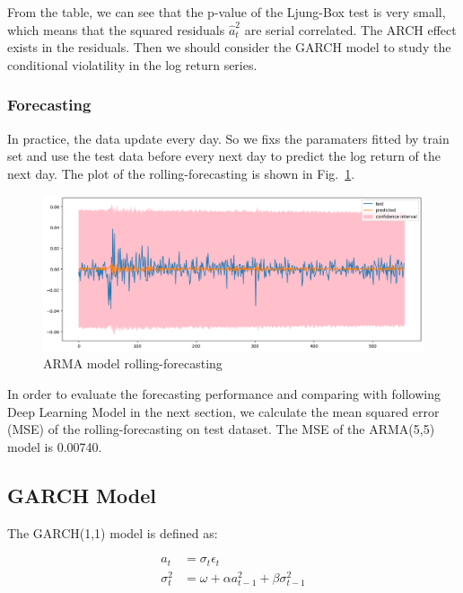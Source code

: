 \documentclass[runningheads]{llncs}
\begin{document}
From the table, we can see that the p-value of the Ljung-Box test is very small, which means that the squared residuals $\hat{a}_t^2$ are serial correlated. The ARCH effect exists in the residuals. Then we should consider the GARCH model to study the conditional violatility in the log return series.

\subsubsection{Forecasting}

In practice, the data update every day. So we fixs the paramaters fitted by train set and use the test data before every next day to predict the log return of the next day.
The plot of the rolling-forecasting is shown in Fig.~\ref{fig:8}.


\begin{figure}[htbp]
    \centering
    \includegraphics[width=\textwidth]{../img/arima_forecast.png}
    \caption{ARMA model rolling-forecasting}
    \label{fig:8}
\end{figure}

In order to evaluate the forecasting performance and comparing with following Deep Learning Model in the next section, we calculate the mean squared error (MSE) of the rolling-forecasting on test dataset. The MSE of the ARMA(5,5) model is 0.00740.

\subsection{GARCH Model}

The GARCH(1,1) model is defined as:

$$
    \begin{aligned}
        a_t        & =\sigma_t \epsilon_t                         \\
        \sigma_t^2 & =\omega+\alpha a_{t-1}^2+\beta\sigma_{t-1}^2
    \end{aligned}
$$
\end{document}
